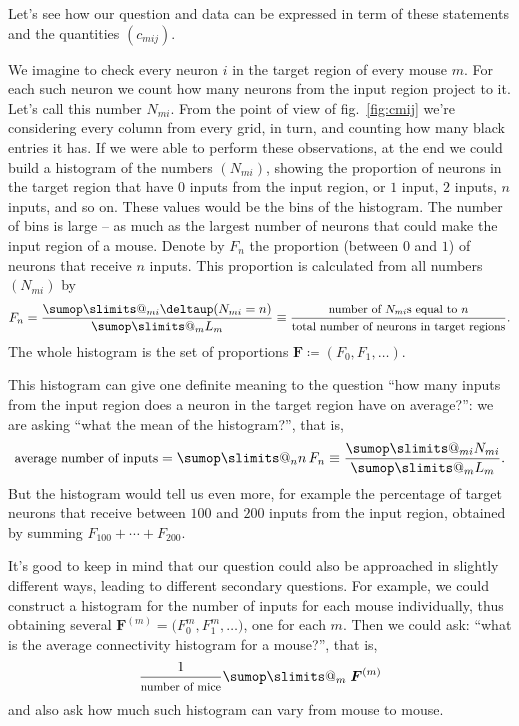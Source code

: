 \documentclass[\ifafour a4paper,12pt,\else a5paper,10pt,\fi%
onecolumn,oneside,article,%
british%
]{memoir}
\makeatletter
\theoremstyle{remark}
\theoremstyle{innote}
\def\sum{\DOTSI\sumop\slimits@}
\newcommand*{\delt}{\deltaup}%
\newcommand*{\defd}{\coloneqq}
\renewcommand*{\|}[1][]{\nonscript\,#1\vert\nonscript\;\mathopen{}}
\newcommand*{\fig}{fig.}%
\newcommand*{\yc}{c}
\newcommand*{\yN}{N}
\newcommand*{\yF}{\bm{F}}
\makeatother
\begin{document}
\bigskip


Let's see how our question and data can be expressed in term of these
statements and the quantities $(\yc_{mij})$.

We imagine to check every neuron $i$ in the target region of every mouse
$m$. For each such neuron we count how many neurons from the input region
project to it. Let's call this number $\yN_{mi}$. From the point of view of
\fig~\ref{fig:cmij} we're considering every column from every grid, in
turn, and counting how many black entries it has. If we were able to
perform these observations, at the end we could build a histogram of the
numbers $(\yN_{mi})$, showing the proportion of neurons in the target
region that have $0$ inputs from the input region, or $1$ input, $2$
inputs, $n$ inputs, and so on. These values would be the bins of the
histogram. The number of bins is large -- as much as the largest number of
neurons that could make the input region of a mouse. Denote by $F_{n}$ the
proportion (between $0$ and $1$) of neurons that receive $n$ inputs. This
proportion is calculated from all numbers $(\yN_{mi})$ by
\begin{equation}
  \label{eq:histogram_from_N}
F_{n} =
\frac{\sum_{mi}\delt(\yN_{mi}=n)}{\sum_{m}L_{m}} \equiv
  \frac{\text{\small number of $\yN_{mi}$s equal to $n$}}
  {\text{\small total number of neurons in target regions}}.
\end{equation}
The whole histogram is the set of proportions
$\yF \defd (F_{0}, F_{1}, \dotsc)$.


This histogram can give one definite meaning to the question \enquote{how
  many inputs from the input region does a neuron in the target region have
  on average?}: we are asking \enquote{what the mean of the histogram?},
that is,
\begin{equation}
  \label{eq:mean_histogram}
  \text{\small average number of inputs} =
  \sum_{n}n\,F_{n} \equiv \frac{\sum_{mi}\yN_{mi}}{\sum_{m}L_{m}}.
\end{equation}
But the histogram would tell us even more, for example the percentage of
target neurons that receive between $100$ and $200$ inputs from the input
region, obtained by summing $F_{100} + \dotsb + F_{200}$.

It's good to keep in mind that our question could also be approached in
slightly different ways, leading to different secondary questions. For
example, we could construct a histogram for the number of inputs for each
mouse individually, thus obtaining several
$\yF^{(m)}=\bigl(F^{{m}}_{0}, F^{{m}}_{1}, \dotsc)$, one for each $m$. Then
we could ask: \enquote{what is the average connectivity histogram for a
  mouse?}, that is,
\begin{equation}
  \label{eq:average_histogram_per_mouse}
  \frac{1}{\text{\footnotesize number of mice}}\sum_{m}\; \yF^{(m)}
\end{equation}
and also ask how much such histogram can vary from mouse to mouse.
\end{document}
